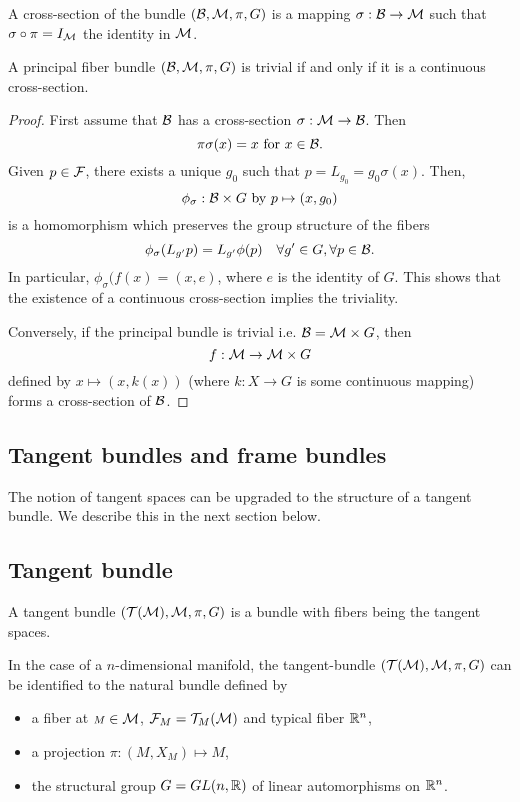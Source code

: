 \begin{definition} 
A cross-section of the bundle $(\mathcal{B},\mathcal{M},\pi,G)$ is a mapping $\sigma: \mathcal{B}  \to
\mathcal{M}$ such that $\sigma \circ \pi = I_{\mathcal{M}}$ the identity in $\mathcal{M}$.
\end{definition}

\begin{theorem}
 A principal fiber bundle $(\mathcal{B},\mathcal{M},\pi, G)$ is trivial if and only if it is a continuous cross-section.
\end{theorem}

\begin{proof}
First assume that $\mathcal{B}$ has a cross-section $\sigma: \mathcal{M} \to \mathcal{B}$. Then
\[
\pi \sigma(x) =x \text{ for } x\in \mathcal{B}. 
\]
Given $p\in \mathcal{F}$, there exists a unique $g_0$ such that $p= L_{g_0}=g_0\sigma(x)$. 
Then, 
\[
 \phi_\sigma : \mathcal{B} \times G \text{ by } p\mapsto (x,g_0)
 \]
 is a homomorphism which preserves the group structure of the fibers
\[ 
\phi_\sigma(L_{g'} p) =L_{g'}\phi(p) \quad \forall g'\in G, \forall p\in \mathcal{B}.
\]
In particular, $\phi_\sigma(f(x)=(x,e)$, where $e$ is the identity of $G$.
This shows that the existence of a continuous cross-section implies the triviality.

Conversely, if the principal bundle is trivial i.e. $\mathcal{B}= \mathcal{M} \times G$,  then \[f:\mathcal{M} \to \mathcal{M} \times G\] defined by $x\mapsto (x,k(x))$ (where $k : X \to G$ is some continuous mapping) forms a cross-section of $\mathcal{B}$.
\end{proof}

\subsection{Tangent bundles and frame bundles} The notion of tangent spaces can be upgraded to the structure of a tangent bundle. We describe this in the next section below. 
\subsection{\bf Tangent bundle}
\begin{definition} 
A tangent bundle $(\mathcal{T}(\mathcal{M}),\mathcal{M},\pi,G)$ is a bundle with fibers being the tangent spaces. 
\end{definition}

In the case of a $n$-dimensional manifold, the tangent-bundle  $(\mathcal{T}(\mathcal{M}), \mathcal{M}, \pi,G)$ can be identified to the natural bundle defined by
\begin{itemize}
	\item a fiber at ${\scriptstyle M}\in \mathcal{M}$, $\mathcal{F}_{{\scriptstyle M}}= \mathcal{T}_{\scriptstyle M}(\mathcal{M})$ and typical fiber $\mathbb{R}^{n}$,
	\item a projection $\pi:({\scriptstyle M},X_{{\scriptstyle M}}) \mapsto {\scriptstyle M}$, 
		\item the structural group $G=GL(n,\mathbb{R})$ of linear automorphisms on
$\mathbb{R}^{n}$.
\end{itemize}

